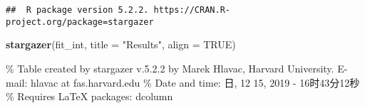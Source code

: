 \documentclass[]{article}
\newenvironment{Shaded}{\begin{snugshade}}{\end{snugshade}}
\newcommand{\DataTypeTok}[1]{\textcolor[rgb]{0.13,0.29,0.53}{#1}}
\newcommand{\KeywordTok}[1]{\textcolor[rgb]{0.13,0.29,0.53}{\textbf{#1}}}
\newcommand{\NormalTok}[1]{#1}
\newcommand{\OtherTok}[1]{\textcolor[rgb]{0.56,0.35,0.01}{#1}}
\newcommand{\StringTok}[1]{\textcolor[rgb]{0.31,0.60,0.02}{#1}}
\begin{document}
\begin{verbatim}
##  R package version 5.2.2. https://CRAN.R-project.org/package=stargazer
\end{verbatim}

\begin{Shaded}
\begin{Highlighting}[]
\KeywordTok{stargazer}\NormalTok{(fit_int, }\DataTypeTok{title =} \StringTok{"Results"}\NormalTok{, }\DataTypeTok{align =} \OtherTok{TRUE}\NormalTok{)}
\end{Highlighting}
\end{Shaded}

\% Table created by stargazer v.5.2.2 by Marek Hlavac, Harvard
University. E-mail: hlavac at fas.harvard.edu \% Date and time: 日, 12
15, 2019 - 16时43分12秒 \% Requires LaTeX packages: dcolumn
\end{document}
